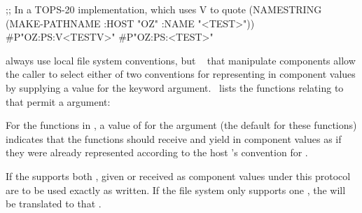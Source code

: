 \code
 ;; In a TOPS-20 implementation, which uses {\hat}V to quote 
 (NAMESTRING (MAKE-PATHNAME :HOST "OZ" :NAME "<TEST>"))
\EV #P"OZ:PS:{\hat}V<TEST{\hat}V>"
\NV #P"OZ:PS:<TEST>"
\endcode

 
\endsubsubsubsection%



 always use local file system  conventions, 
but \clisp\  that manipulate  components
allow the caller to select either of two conventions for representing
 in component values by supplying a value for the
 keyword argument.
\Thenextfigure\ lists the functions 
relating to  that permit a  argument:



For the functions in \figref\PathnameCaseFuns,
a value of  for the  argument 
(the default for these functions)
indicates that the functions should receive and yield  in component values
as if they were already represented according to the host 's 
convention for .

If the  supports both ,  given or received
as  component values under this protocol are to be used exactly
as written.  If the file system only supports one , 
the  will be translated to that .

\endsubsubsubsubsection%


